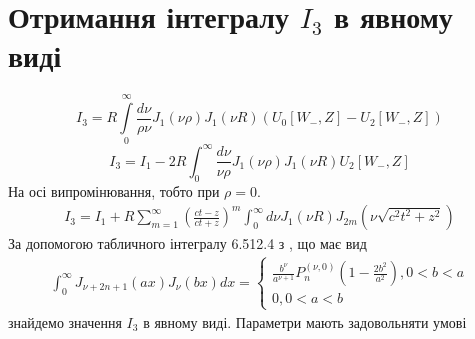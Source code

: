 \section{Отримання інтегралу $ I_3 $ в явному виді}

\begin{equation}
I_3 = R \int \limits_{0}^{\infty} \frac{d \nu}{\rho \nu} 
J_1(\nu \rho) J_1(\nu R) (U_0[ W_-, Z ] - U_2[ W_-, Z ])
\end{equation}
%
\begin{equation} \label{eq:intergal3}
I_3 = I_1 - 2 R \int_{0}^{\infty} \frac{d \nu}{\nu \rho} 
J_1(\nu \rho) J_1(\nu R) U_2[ W_-, Z ]
\end{equation}
%
На осі випромінювання, тобто при $ \rho = 0 $. 
%
%
\begin{equation} \begin{aligned} \label{eq:i3_pol_int}
I_3 = I_1 + R \sum_{m=1}^{\infty} \left( \frac{ct - z}{ct + z} \right)^m 
\int_{0}^{\infty} d \nu J_1(\nu R) J_{2m} (\nu \sqrt{c^2t^2 + z^2})
\end{aligned} \end{equation}
%
За допомогою табличного інтегралу 6.512.4 з 
\cite[ст. 681]{imp:GradshtejnInt}, що має вид
%
\begin{equation*} \begin{aligned}
\int_0^\infty J_{\nu+2n+1} (ax) J_\nu (bx) dx = 
\begin{cases} \frac{b^\nu}{a^{\nu+1}}
P_n^{(\nu,0)} \left( 1 - \frac{2b^2}{a^2} \right) , 0 < b < a \\
0, 0 < a < b \end{cases}
\end{aligned} \end{equation*}
%
знайдемо значення $ I_3 $ в явному виді. Параметри мають задовольняти умові  
